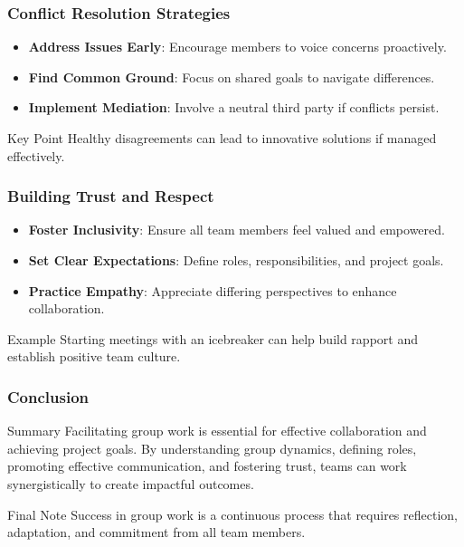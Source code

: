 \documentclass{beamer}
\begin{document}
\begin{frame}[fragile]
    \frametitle{Conflict Resolution Strategies}
    \begin{itemize}
        \item \textbf{Address Issues Early}: Encourage members to voice concerns proactively.
        \item \textbf{Find Common Ground}: Focus on shared goals to navigate differences.
        \item \textbf{Implement Mediation}: Involve a neutral third party if conflicts persist.
    \end{itemize}
    \begin{block}{Key Point}
        Healthy disagreements can lead to innovative solutions if managed effectively.
    \end{block}
\end{frame}

\begin{frame}[fragile]
    \frametitle{Building Trust and Respect}
    \begin{itemize}
        \item \textbf{Foster Inclusivity}: Ensure all team members feel valued and empowered.
        \item \textbf{Set Clear Expectations}: Define roles, responsibilities, and project goals.
        \item \textbf{Practice Empathy}: Appreciate differing perspectives to enhance collaboration.
    \end{itemize}
    \begin{block}{Example}
        Starting meetings with an icebreaker can help build rapport and establish positive team culture.
    \end{block}
\end{frame}

\begin{frame}[fragile]
    \frametitle{Conclusion}
    \begin{block}{Summary}
        Facilitating group work is essential for effective collaboration and achieving project goals.
        By understanding group dynamics, defining roles, promoting effective communication, and fostering trust, teams can work synergistically to create impactful outcomes.
    \end{block}
    \begin{block}{Final Note}
        Success in group work is a continuous process that requires reflection, adaptation, and commitment from all team members.
    \end{block}
\end{frame}
\end{document}
